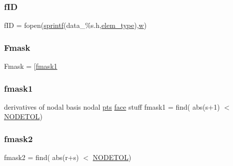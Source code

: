 \subsubsection{\texorpdfstring{f\+ID}{fID}}
{\footnotesize\ttfamily f\+ID = fopen(\hyperlink{a00575_ae6aab5c308faac0fc539cc9c6da9fbd0}{sprintf}(\textquotesingle{}data\+\_\+\%s.\+h\textquotesingle{},\hyperlink{a00473_a9e84386471d07238c03b10507f58eba9}{elem\+\_\+type}),\textquotesingle{}\hyperlink{a00605_aad57484016654da87125db86f4227ea3}{w}\textquotesingle{})}

\mbox{\label{a01014_a9d248ff3c701af57ed3e241d735bd034}} 
\subsubsection{\texorpdfstring{Fmask}{Fmask}}
{\footnotesize\ttfamily Fmask = \mbox{[}\hyperlink{a00575_a94fc3ab9217cab318ada4ca502b10620}{fmask1}}

\mbox{\label{a01014_a1a1dec21df6e8b9d02462f97b957473d}} 
\subsubsection{\texorpdfstring{fmask1}{fmask1}}
{\footnotesize\ttfamily derivatives of nodal basis nodal \hyperlink{a00473_a7d2fb616b76863109aa80a7ffdfad72b}{pts} \hyperlink{a00611_ac4ec0037ba529da25bf084669a45f60c}{face} stuff fmask1 = find( abs(s+1) $<$ \hyperlink{a00575_a409781c62c346e9048df00ae7d289582}{N\+O\+D\+E\+T\+OL})\textquotesingle{}}

\mbox{\label{a01014_a2db7941f6935f48a7799d8214a5da8e7}} 
\subsubsection{\texorpdfstring{fmask2}{fmask2}}
{\footnotesize\ttfamily fmask2 = find( abs(r+s) $<$ \hyperlink{a00575_a409781c62c346e9048df00ae7d289582}{N\+O\+D\+E\+T\+OL})\textquotesingle{}}

